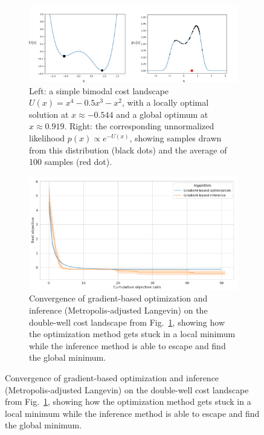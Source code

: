 \begin{figure}[tb]
    \centering
    \begin{subfigure}[b]{\linewidth}
        \centering
        \includegraphics[width=0.9\linewidth]{images/global_methods/sampling_as_optimization.png}
        \caption{Left: a simple bimodal cost landscape $U(x) = x^4 - 0.5 x^3 - x^2$, with a locally optimal solution at $x\approx -0.544$ and a global optimum at $x\approx 0.919$. Right: the corresponding unnormalized likelihood $p(x) \propto e^{-U(x)}$, showing samples drawn from this distribution (black dots) and the average of 100 samples (red dot).}
        \label{ch:corl:fig:toy_example}
    \end{subfigure}

    \begin{subfigure}[b]{\linewidth}
        \centering
        \includegraphics[width=0.7\linewidth]{images/global_methods/double_well_gd_mala.png}
        \caption{Convergence of gradient-based optimization and inference (Metropolis-adjusted Langevin) on the double-well cost landscape from Fig.~\ref{ch:corl:fig:toy_example}, showing how the optimization method gets stuck in a local minimum while the inference method is able to escape and find the global minimum.}
        \label{ch:corl:fig:toy_example_convergence}
    \end{subfigure}
\end{figure}

